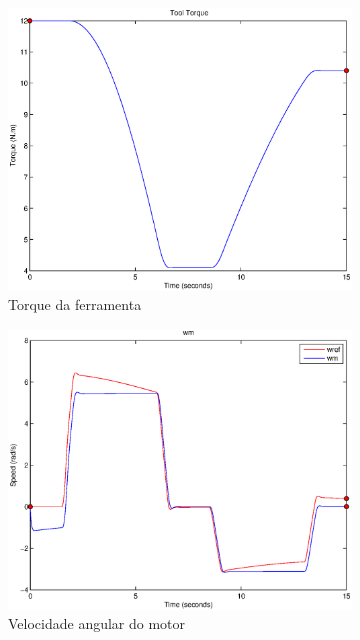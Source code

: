 \documentclass{article}
\begin{document}
\begin{figure}[H]
\begin{subfigure}{0.3\textwidth}
		\includegraphics[width=\linewidth]{matlab/t5}
		\caption{Torque da ferramenta}
	\end{subfigure}
	\begin{subfigure}{0.3\textwidth}
		\includegraphics[width=\linewidth]{matlab/wm5}
		\caption{Velocidade angular do motor}
	\end{subfigure}
	\begin{subfigure}{0.3\textwidth}

\end{subfigure}
\end{figure}
\end{document}
